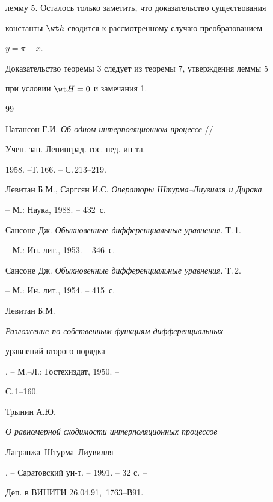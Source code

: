 лемму 5. Осталось только заметить, что доказательство существования 


константы $\wt h$ сводится к рассмотренному случаю преобразованием 


$y=\pi-x$. 


\smallskip 


 


Доказательство теоремы 3 следует из теоремы 7, утверждения леммы 5 


при условии $\wt H=0$ и замечания 1. 


 


\begin{thebibliography}{99} 


 




Натансон Г.И. {\em Об одном интерполяционном процессе} // 


Учен. зап. Ленинград. гос. пед. ин-та. -- 


1958. --Т.\,166. -- С.\,213--219. 




Левитан Б.М., Саргсян И.С. {\em Операторы Штурма--Лиувилля и Дирака}. 


-- М.: Наука, 1988. -- 432~с. 




Сансоне Дж. {\em Обыкновенные дифференциальные уравнения}. Т.\,1.


-- М.: Ин. лит., 1953. -- 346~с. 




Сансоне Дж. {\em Обыкновенные дифференциальные уравнения}. Т.\,2.


-- М.: Ин. лит., 1954. -- 415~с. 




Левитан Б.М. {\em Разложение по собственным функциям дифференциальных 


уравнений второго порядка}. -- М.--Л.: Гостехиздат, 1950. -- 


С.\,1--160. 




Трынин А.Ю. {\em О равномерной сходимости интерполяционных процессов 


Лагранжа--Штурма--Лиувилля}. -- Саратовский ун-т. -- 1991. -- 32 с. -- 


Деп. в ВИНИТИ 26.04.91, \No\,1763--В91. 



\end{thebibliography}
